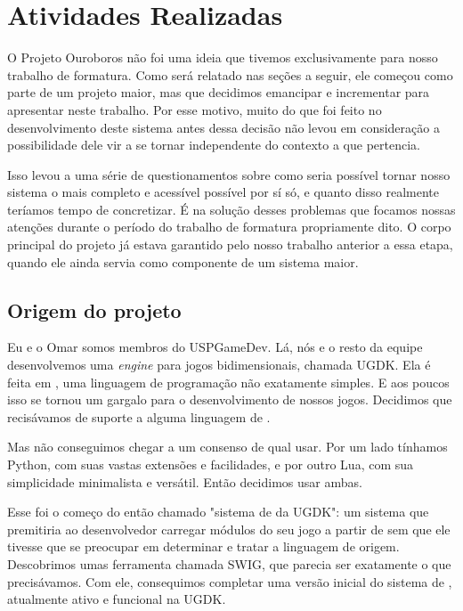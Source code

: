 \def\classname#1{\texttt{#1}}

\chapter{Atividades Realizadas}
\label{sec:atividades}

O Projeto Ouroboros não foi uma ideia que tivemos exclusivamente para nosso
trabalho de formatura. Como será relatado nas seções a seguir, ele começou como
parte de um projeto maior, mas que decidimos emancipar e incrementar para
apresentar neste trabalho. Por esse motivo, muito do que foi feito no
desenvolvimento deste sistema antes dessa decisão não levou em consideração a
possibilidade dele vir a se tornar independente do contexto a que pertencia.

Isso levou a uma série de questionamentos sobre como seria possível tornar nosso
sistema o mais completo e acessível possível por sí só, e quanto disso realmente
teríamos tempo de concretizar. É na solução desses problemas que focamos nossas
atenções durante o período do trabalho de formatura propriamente dito. O corpo
principal do projeto já estava garantido pelo nosso trabalho anterior a essa
etapa, quando ele ainda servia como componente de um sistema maior.

\section{Origem do projeto}
\label{sec:atividades:origem}

Eu e o Omar somos membros do USPGameDev. Lá, nós e o resto da equipe
desenvolvemos uma \emph{engine} para jogos bidimensionais, chamada UGDK. Ela é
feita em \CXX{}, uma linguagem de programação não exatamente simples. E aos
poucos isso se tornou um gargalo para o desenvolvimento de nossos jogos.
Decidimos que recisávamos de suporte a alguma linguagem de \script{}.

Mas não conseguimos chegar a um consenso de qual usar. Por um lado tínhamos
Python, com suas vastas extensões e facilidades, e por outro Lua, com sua
simplicidade minimalista e versátil. Então decidimos usar ambas.

Esse foi o começo do então chamado "sistema de \script{} da UGDK": um sistema
que premitiria ao desenvolvedor carregar módulos do seu jogo a partir de
\script{} sem que ele tivesse que se preocupar em determinar e tratar a
linguagem de origem. Descobrimos umas ferramenta chamada SWIG, que parecia ser
exatamente o que precisávamos. Com ele, consequimos completar uma versão inicial
do sistema de \script{}, atualmente ativo e funcional na UGDK.

